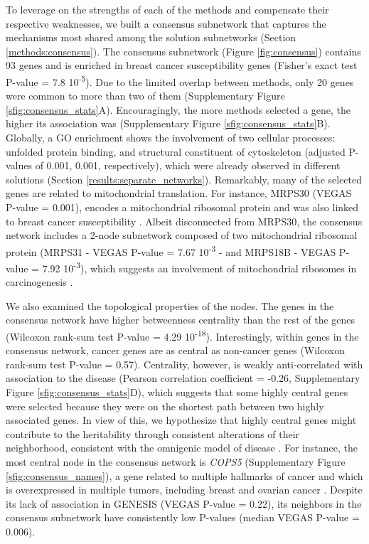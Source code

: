 \documentclass[twocolumn, 10pt]{article}
\begin{document}
To leverage on the strengths of each of the methods and compensate their respective weaknesses, we built a consensus subnetwork that captures the mechanisms most shared among the solution subnetworks (Section \ref{methods:consensus}). The consensus subnetwork (Figure \ref{fig:consensus}) contains 93 genes and is enriched in breast cancer susceptibility genes (Fisher's exact test P-value = 7.8 \texttimes{} 10\textsuperscript{-5}). Due to the limited overlap between methods, only 20 genes were common to more than two of them (Supplementary Figure \ref{sfig:consensus_stats}A). Encouragingly, the more methods selected a gene, the higher its association was (Supplementary Figure \ref{sfig:consensus_stats}B). Globally, a GO enrichment shows the involvement of two cellular processes: unfolded protein binding, and structural constituent of cytoskeleton (adjusted P-values of 0.001, 0.001, respectively), which were already observed in different solutions (Section \ref{results:separate_networks}). Remarkably, many of the selected genes are related to mitochondrial translation. For instance, MRPS30 (VEGAS P-value = 0.001), encodes a mitochondrial ribosomal protein and was also linked to breast cancer susceptibility \cite{quigley_5p12_2014}. Albeit disconnected from MRPS30, the consensus network includes a 2-node subnetwork composed of two mitochondrial ribosomal protein (MRPS31 - VEGAS P-value = 7.67 \texttimes{} 10\textsuperscript{-3} - and MRPS18B - VEGAS P-value = 7.92 \texttimes{} 10\textsuperscript{-3}), which suggests an involvement of mitochondrial ribosomes in carcinogenesis \cite{required}.

We also examined the topological properties of the nodes. The genes in the consensus network have higher betweenness centrality than the rest of the genes (Wilcoxon rank-sum test P-value = 4.29 \texttimes{} 10\textsuperscript{-18}). Interestingly, within genes in the consensus network, cancer genes are as central as non-cancer genes (Wilcoxon rank-sum test P-value = 0.57). Centrality, however, is weakly anti-correlated with association to the disease (Pearson correlation coefficient = -0.26, Supplementary Figure \ref{sfig:consensus_stats}D), which suggests that some highly central genes were selected because they were on the shortest path between two highly associated genes. In view of this, we hypothesize that highly central genes might contribute to the heritability through consistent alterations of their neighborhood, consistent with the omnigenic model of disease \cite{boyle_expanded_2017}. For instance, the most central node in the consensus network is \emph{COPS5} (Supplementary Figure \ref{sfig:consensus_names}), a gene related to multiple hallmarks of cancer and which is overexpressed in multiple tumors, including breast and ovarian cancer \cite{liu_jab1_cops5_2018}. Despite its lack of association in GENESIS (VEGAS P-value = 0.22), its neighbors in the consensus subnetwork have consistently low P-values (median VEGAS P-value = 0.006).
\end{document}
